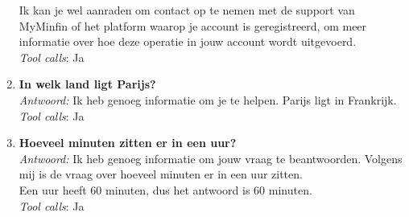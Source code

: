 \begin{enumerate}
    Ik kan je wel aanraden om contact op te nemen met de support van MyMinfin of het platform waarop je account is geregistreerd, om meer informatie over hoe deze operatie in jouw account wordt uitgevoerd.\\
    \textit{Tool calls}: Ja 
    \item \textbf{In welk land ligt Parijs?}\\
    \textit{Antwoord:} Ik heb genoeg informatie om je te helpen. Parijs ligt in Frankrijk.\\
    \textit{Tool calls}: Ja 
    \item \textbf{Hoeveel minuten zitten er in een uur?}\\
    \textit{Antwoord:} Ik heb genoeg informatie om jouw vraag te beantwoorden. Volgens mij is de vraag over hoeveel minuten er in een uur zitten.\\
    Een uur heeft 60 minuten, dus het antwoord is 60 minuten.\\
    \textit{Tool calls}: Ja 
\end{enumerate}


